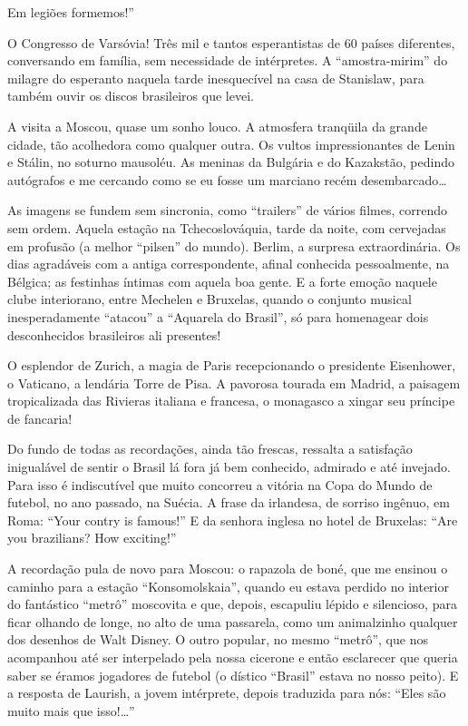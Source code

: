 Em legiões formemos!”


O Congresso de Varsóvia! Três mil e tantos esperantistas de 60 países diferentes, conversando em família, sem necessidade de intérpretes. A “amostra-mirim” do milagre do esperanto naquela tarde inesquecível na casa de Stanislaw, para também ouvir os discos brasileiros que levei.

A visita a Moscou, quase um sonho louco. A atmosfera tranqüila da grande cidade, tão acolhedora como qualquer outra. Os vultos impressionantes de Lenin e Stálin, no soturno mausoléu. As meninas da Bulgária e do Kazakstão, pedindo autógrafos e me cercando como se eu fosse um marciano recém desembarcado\ldots

As imagens se fundem sem sincronia, como “trailers” de vários filmes, correndo sem ordem. Aquela estação na Tchecoslováquia, tarde da noite, com cervejadas em profusão (a melhor “pilsen” do mundo). Berlim, a surpresa extraordinária. Os dias agradáveis com a antiga correspondente, afinal conhecida pessoalmente, na Bélgica; as festinhas íntimas com aquela boa gente. E a forte emoção naquele clube interiorano, entre Mechelen e Bruxelas, quando o conjunto musical inesperadamente “atacou” a “Aquarela do Brasil”, só para homenagear dois desconhecidos brasileiros ali presentes!

O esplendor de Zurich, a magia de Paris recepcionando o presidente Eisenhower, o Vaticano, a lendária Torre de Pisa. A pavorosa tourada em Madrid, a paisagem tropicalizada das Rivieras italiana e francesa, o monagasco a xingar seu príncipe de fancaria!

Do fundo de todas as recordações, ainda tão frescas, ressalta a satisfação inigualável de sentir o Brasil lá fora já bem conhecido, admirado e até invejado. Para isso é indiscutível que muito concorreu a vitória na Copa do Mundo de futebol, no ano passado, na Suécia. A frase da irlandesa, de sorriso ingênuo, em Roma: “Your contry is famous!” E da senhora inglesa no hotel de Bruxelas: “Are you brazilians? How exciting!”

A recordação pula de novo para Moscou: o rapazola de boné, que me ensinou o caminho para a estação “Konsomolskaia”, quando eu estava perdido no interior do fantástico “metrô” moscovita e que, depois, escapuliu lépido e silencioso, para ficar olhando de longe, no alto de uma passarela, como um animalzinho qualquer dos desenhos de Walt Disney. O outro popular, no mesmo “metrô”, que nos acompanhou até ser interpelado pela nossa cicerone e então esclarecer que queria saber se éramos jogadores de futebol (o dístico “Brasil” estava no nosso peito). E a resposta de Laurish, a jovem intérprete, depois traduzida para nós: “Eles são muito mais que isso!\ldots”

